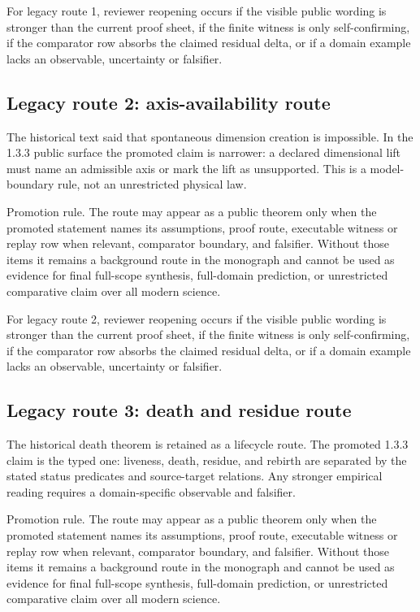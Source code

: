 For legacy route 1, reviewer reopening occurs if the visible public wording is stronger than the current proof sheet, if the finite witness is only self-confirming, if the comparator row absorbs the claimed residual delta, or if a domain example lacks an observable, uncertainty or falsifier.


\subsection{Legacy route 2: axis-availability route}

The historical text said that spontaneous dimension creation is impossible. In the 1.3.3 public surface the promoted claim is narrower: a declared dimensional lift must name an admissible axis or mark the lift as unsupported. This is a model-boundary rule, not an unrestricted physical law.


Promotion rule. The route may appear as a public theorem only when the promoted statement names its assumptions, proof route, executable witness or replay row when relevant, comparator boundary, and falsifier. Without those items it remains a background route in the monograph and cannot be used as evidence for final full-scope synthesis, full-domain prediction, or unrestricted comparative claim over all modern science.


For legacy route 2, reviewer reopening occurs if the visible public wording is stronger than the current proof sheet, if the finite witness is only self-confirming, if the comparator row absorbs the claimed residual delta, or if a domain example lacks an observable, uncertainty or falsifier.


\subsection{Legacy route 3: death and residue route}

The historical death theorem is retained as a lifecycle route. The promoted 1.3.3 claim is the typed one: liveness, death, residue, and rebirth are separated by the stated status predicates and source-target relations. Any stronger empirical reading requires a domain-specific observable and falsifier.


Promotion rule. The route may appear as a public theorem only when the promoted statement names its assumptions, proof route, executable witness or replay row when relevant, comparator boundary, and falsifier. Without those items it remains a background route in the monograph and cannot be used as evidence for final full-scope synthesis, full-domain prediction, or unrestricted comparative claim over all modern science.


